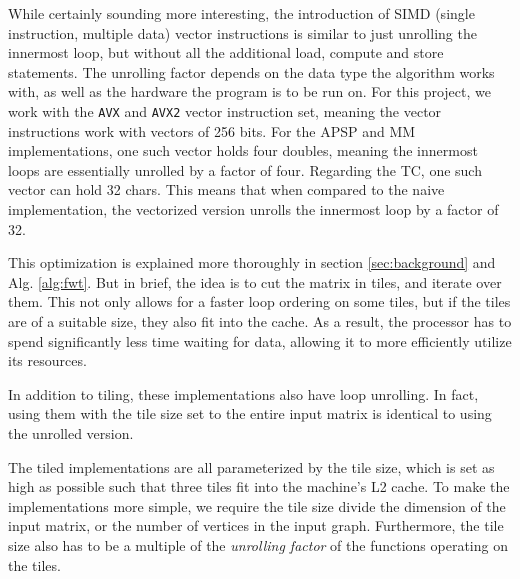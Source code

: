 
\label{method:simd}
While certainly sounding more interesting, the introduction of SIMD (single instruction, multiple data) vector instructions is similar to just unrolling the innermost loop, but without all the additional load, compute and store statements. The unrolling factor depends on the data type the algorithm works with, as well as the hardware the program is to be run on.
For this project, we work with the \texttt{AVX} and \texttt{AVX2} vector instruction set, meaning the vector instructions work with vectors of 256 bits.
For the APSP and MM implementations, one such vector holds four doubles, meaning the innermost loops are essentially unrolled by a factor of four.
Regarding the TC, one such vector can hold 32 chars. This means that when compared to the naive implementation, the vectorized version unrolls the innermost loop by a factor of 32.

This optimization is explained more thoroughly in section \ref{sec:background} and Alg. \ref{alg:fwt}. But in brief, the idea is to cut the matrix in tiles, and iterate over them. This not only allows for a faster loop ordering on some tiles, but if the tiles are of a suitable size, they also fit into the cache.
As a result, the processor has to spend significantly less time waiting for data, allowing it to more efficiently utilize its resources.

In addition to tiling, these implementations also have loop unrolling. In fact, using them with the tile size set to the entire input matrix is identical to using the unrolled version.

The tiled implementations are all parameterized by the tile size, which is set as high as possible such that three tiles fit into the machine's L2 cache.
To make the implementations more simple, we require the tile size divide the dimension of the input matrix, or the number of vertices in the input graph.
Furthermore, the tile size also has to be a multiple of the \emph{unrolling factor} of the functions operating on the tiles.

